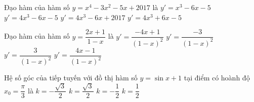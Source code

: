 \begin{ex}%
	Đạo hàm của hàm số $y=x^4-3x^2-5x+2017$ là
	\choice
	{$y'=x^3-6x-5$}
	{\True $y'=4x^3-6x-5$}
	{$y'=4x^3-6x+2017$}
	{$y'=4x^3+6x-5$}
\end{ex}
\begin{ex}%
	Đạo hàm của hàm số $y=\dfrac{2x+1}{1-x}$ là	
	\choice
	{$y'=\dfrac{-4x+1}{(1-x)^2}$}
	{$y'=\dfrac{-3}{(1-x)^2}$}
	{\True $y'=\dfrac{3}{(1-x)^2}$}
	{$y'=\dfrac{4x-1}{(1-x)^2}$}
\end{ex}

\begin{ex}%
	Hệ số góc của tiếp tuyến với đồ thị hàm số $y=\sin x+1$ tại điểm có hoành độ $x_0=\dfrac{\pi}{3}$ là
	\choice
	{$k=-\dfrac{\sqrt{3}}{2}$}
	{$k=\dfrac{\sqrt{3}}{2}$}
	{$k=-\dfrac{1}{2}$}
	{\True $k=\dfrac{1}{2}$}
\end{ex}



